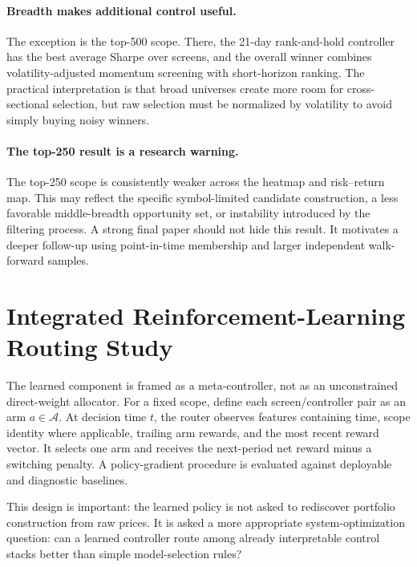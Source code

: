 \documentclass[11pt,a4paper]{article}
\begin{document}
\paragraph{Breadth makes additional control useful.} The exception is the top-500 scope. There, the 21-day rank-and-hold controller has the best average Sharpe over screens, and the overall winner combines volatility-adjusted momentum screening with short-horizon ranking. The practical interpretation is that broad universes create more room for cross-sectional selection, but raw selection must be normalized by volatility to avoid simply buying noisy winners.
\paragraph{The top-250 result is a research warning.} The top-250 scope is consistently weaker across the heatmap and risk--return map. This may reflect the specific symbol-limited candidate construction, a less favorable middle-breadth opportunity set, or instability introduced by the filtering process. A strong final paper should not hide this result. It motivates a deeper follow-up using point-in-time membership and larger independent walk-forward samples.

\section{Integrated Reinforcement-Learning Routing Study}
The learned component is framed as a meta-controller, not as an unconstrained direct-weight allocator. For a fixed scope, define each screen/controller pair as an arm $a\in\mathcal{A}$. At decision time $t$, the router observes features containing time, scope identity where applicable, trailing arm rewards, and the most recent reward vector. It selects one arm and receives the next-period net reward minus a switching penalty. A policy-gradient procedure is evaluated against deployable and diagnostic baselines.

This design is important: the learned policy is not asked to rediscover portfolio construction from raw prices. It is asked a more appropriate system-optimization question: can a learned controller route among already interpretable control stacks better than simple model-selection rules?
\end{document}
